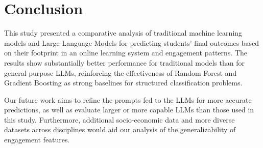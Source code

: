 \section{Conclusion}
This study presented a comparative analysis of traditional machine learning models and Large Language Models for predicting students' final outcomes based on their footprint in an online learning system and engagement patterns. The results show substantially better performance for traditional models than for general-purpose LLMs, reinforcing the effectiveness of Random Forest and Gradient Boosting as strong baselines for structured classification problems.

Our future work aims to refine the prompts fed to the LLMs for more accurate predictions, as well as evaluate larger or more capable LLMs than those used in this study. Furthermore, additional socio-economic data and more diverse datasets across disciplines would aid our analysis of the generalizability of engagement features.